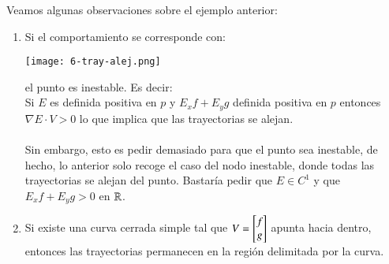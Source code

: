 \begin{obs}
    Veamos algunas observaciones sobre el ejemplo anterior:\\
    \begin{enumerate}
        \item Si el comportamiento se corresponde con:
            \begin{center}
                \texttt{[image: 6-tray-alej.png]}
            \end{center}
             el punto es inestable. Es decir:\\
             Si $E$ es definida positiva en $p$ y $E_x f + E_y g$ definida positiva en $p$ entonces $\nabla E \cdot V > 0$ lo que implica que las trayectorias se alejan.\\\\
             Sin embargo, esto es pedir demasiado para que el punto sea inestable, de hecho, lo anterior solo recoge el caso del nodo inestable, donde todas las trayectorias se alejan del punto. Bastaría pedir que $E \in C^1$ y que $E_x f + E_y g > 0$ en $\mathbb{R}$.
        \item Si existe una curva cerrada simple tal que $V = \mx{f\\ g}$ apunta hacia dentro, entonces las trayectorias permanecen en la región delimitada por la curva.
    \end{enumerate}
\end{obs}
